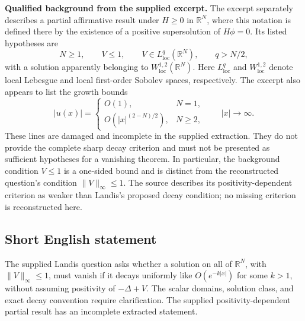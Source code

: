 \documentclass[11pt]{article}
\newcommand{\R}{\mathbb{R}}
\begin{document}
\textbf{Qualified background from the supplied excerpt.} The excerpt separately describes a partial affirmative result under \(H\geq0\) in \(\R^N\), where this notation is defined there by the existence of a positive supersolution of \(H\phi=0\). Its listed hypotheses are
\[
N\geq1,\qquad V\leq1,\qquad V\in L^q_{\mathrm{loc}}(\R^N),\qquad q>N/2,
\]
with a solution apparently belonging to \(W^{1,2}_{\mathrm{loc}}(\R^N)\). Here \(L^q_{\mathrm{loc}}\) and \(W^{1,2}_{\mathrm{loc}}\) denote local Lebesgue and local first-order Sobolev spaces, respectively. The excerpt also appears to list the growth bounds
\[
|u(x)|=
\begin{cases}
O(1),&N=1,\\
O\!\left(|x|^{(2-N)/2}\right),&N\geq2,
\end{cases}
\qquad |x|\to\infty.
\]
These lines are damaged and incomplete in the supplied extraction. They do not provide the complete sharp decay criterion and must not be presented as sufficient hypotheses for a vanishing theorem. In particular, the background condition \(V\leq1\) is a one-sided bound and is distinct from the reconstructed question's condition \(\|V\|_\infty\leq1\). The source describes its positivity-dependent criterion as weaker than Landis's proposed decay condition; no missing criterion is reconstructed here.
\subsection{Short English statement}
The supplied Landis question asks whether a solution on all of \(\R^N\), with \(\|V\|_\infty\leq1\), must vanish if it decays uniformly like \(O(e^{-k|x|})\) for some \(k>1\), without assuming positivity of \(-\Delta+V\). The scalar domains, solution class, and exact decay convention require clarification. The supplied positivity-dependent partial result has an incomplete extracted statement.
\end{document}
